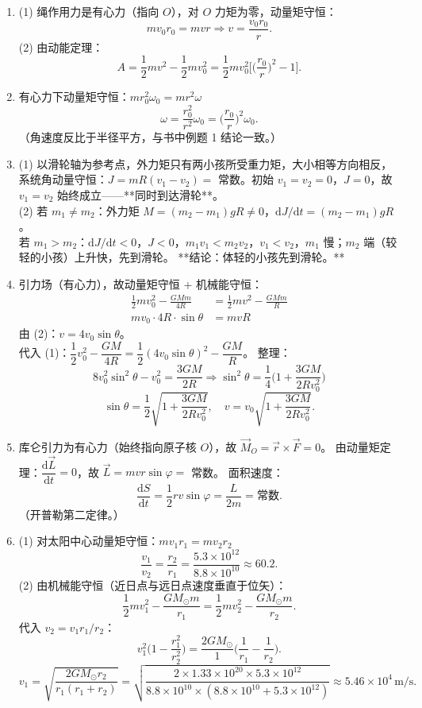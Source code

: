 \documentclass[12pt]{article}
\begin{document}
\begin{enumerate}[label=\textbf{例\arabic*.}, leftmargin=*]
\item (1) 绳作用力是有心力（指向 $O$），对 $O$ 力矩为零，动量矩守恒：
\[
  mv_0 r_0 = mvr \Rightarrow v = \frac{v_0 r_0}{r}.
\]
(2) 由动能定理：
\[
  A = \frac{1}{2}mv^2 - \frac{1}{2}mv_0^2 = \frac{1}{2}mv_0^2\biggl[\biggl(\frac{r_0}{r}\biggr)^2 - 1\biggr].
\]

\item 有心力下动量矩守恒：$mr_0^2\omega_0 = mr^2\omega$
\[
  \omega = \frac{r_0^2}{r^2}\omega_0 = \biggl(\frac{r_0}{r}\biggr)^2 \omega_0.
\]
（角速度反比于半径平方，与书中例题 1 结论一致。）

\item (1) 以滑轮轴为参考点，外力矩只有两小孩所受重力矩，大小相等方向相反，系统角动量守恒：$J = mR(v_1 - v_2) = $ 常数。初始 $v_1 = v_2 = 0$，$J = 0$，故 $v_1 = v_2$ 始终成立——**同时到达滑轮**。\\
(2) 若 $m_1 \ne m_2$：外力矩 $M = (m_2 - m_1)gR \ne 0$，$\mathrm{d}J/\mathrm{d}t = (m_2 - m_1)gR$。\\
若 $m_1 > m_2$：$\mathrm{d}J/\mathrm{d}t < 0$，$J < 0$，$m_1 v_1 < m_2 v_2$，$v_1 < v_2$，$m_1$ 慢；$m_2$ 端（较轻的小孩）上升快，先到滑轮。
**结论：体轻的小孩先到滑轮。**

\item 引力场（有心力），故动量矩守恒 + 机械能守恒：
\begin{align}
  \frac{1}{2}mv_0^2 - \frac{GMm}{4R} &= \frac{1}{2}mv^2 - \frac{GMm}{R} \\
  mv_0 \cdot 4R \cdot \sin\theta &= mvR
\end{align}
由 (2)：$v = 4v_0\sin\theta$。\\
代入 (1)：$\dfrac{1}{2}v_0^2 - \dfrac{GM}{4R} = \dfrac{1}{2}(4v_0\sin\theta)^2 - \dfrac{GM}{R}$。
整理：
\[
  8v_0^2\sin^2\theta - v_0^2 = \frac{3GM}{2R} \Rightarrow \sin^2\theta = \frac{1}{4}\biggl(1 + \frac{3GM}{2Rv_0^2}\biggr)
\]
\[
  \sin\theta = \frac{1}{2}\sqrt{1 + \frac{3GM}{2Rv_0^2}},\quad v = v_0\sqrt{1 + \frac{3GM}{2Rv_0^2}}.
\]

\item 库仑引力为有心力（始终指向原子核 $O$），故 $\vec{M}_O = \vec{r}\times\vec{F} = 0$。
由动量矩定理：$\dfrac{\mathrm{d}\vec{L}}{\mathrm{d}t} = 0$，故 $\vec{L} = mvr\sin\varphi = $ 常数。
面积速度：
\[
  \frac{\mathrm{d}S}{\mathrm{d}t} = \frac{1}{2}rv\sin\varphi = \frac{L}{2m} = \text{常数}.
\]
（开普勒第二定律。）

\item (1) 对太阳中心动量矩守恒：$mv_1 r_1 = mv_2 r_2$
\[
  \frac{v_1}{v_2} = \frac{r_2}{r_1} = \frac{5.3 \times 10^{12}}{8.8 \times 10^{10}} \approx 60.2.
\]
(2) 由机械能守恒（近日点与远日点速度垂直于位矢）：
\[
  \frac{1}{2}mv_1^2 - \frac{GM_\odot m}{r_1} = \frac{1}{2}mv_2^2 - \frac{GM_\odot m}{r_2}.
\]
代入 $v_2 = v_1 r_1/r_2$：
\[
  v_1^2\biggl(1 - \frac{r_1^2}{r_2^2}\biggr) = \frac{2GM_\odot}{1}\biggl(\frac{1}{r_1} - \frac{1}{r_2}\biggr).
\]
\[
  v_1 = \sqrt{\frac{2GM_\odot r_2}{r_1(r_1 + r_2)}} = \sqrt{\frac{2 \times 1.33 \times 10^{20} \times 5.3 \times 10^{12}}{8.8 \times 10^{10} \times (8.8 \times 10^{10} + 5.3 \times 10^{12})}} \approx 5.46 \times 10^4\,\mathrm{m/s}.
\]

\end{enumerate}
\end{document}
